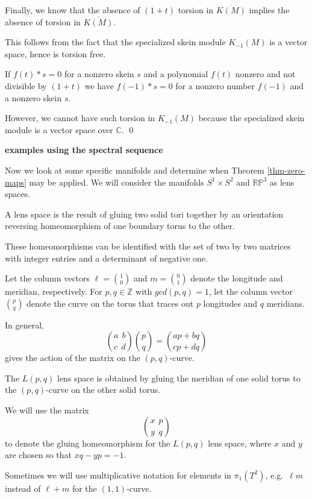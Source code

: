 \documentclass{slides}
\newcommand{\bbc}{\mathbb{C}}
\theoremstyle{definition}
\begin{document}
\begin{slide}
Finally, we know that the absence of $(1+t)$ torsion in
$\overline{K(M)}$ implies the absence of torsion in $\overline{K(M)}$.

This
follows from the fact that the specialized skein module
$K_{-1}(M)$ is a vector space, hence is torsion free.

If $f(t)*s = 0$ for a nonzero skein $s$ and a 
polynomial $f(t)$ nonzero and not divisible by $(1+t)$ we
have $f(-1)*s = 0$ for a nonzero number $f(-1)$ and a
nonzero skein $s$.

However, we cannot have such torsion
in $K_{-1}(M)$ because the specialized skein module is
a vector space over $\bbc$.
\qed
\end{slide}

\begin{slide}
\textbf{examples using the spectral sequence}

Now we look at some specific manifolds and
determine when Theorem \ref{thm-zero-maps} may be applied.
We will consider the manifolds $S^1 \times S^2$ and
$\mathbb{RP}^3$ as lens spaces.

A lens space is the result of
gluing two solid tori together by an
orientation reversing homeomorphism of one boundary torus to
the other.

These homeomorphisms can be identified with the set of
two by two matrices with integer entries and a determinant
of negative one.

Let the column vectors
$\ell = \binom{1}{0}$ and $m = \binom{0}{1}$
denote the longitude and meridian, respectively.
For $p, q \in \mathbb{Z}$
with $gcd(p,q)=1$, let the column vector
$\binom{p}{q}$
denote the
curve on the torus that traces out $p$
longitudes and $q$ meridians.
\end{slide}

\begin{slide}
In general,
$$
\binom{a~~b}{c~~d}
\binom{p}{q}
=
\binom{ap+bq}{cp+dq}
$$
gives the action of the matrix on the $(p,q)$-curve.

The $L(p,q)$ lens space is obtained by gluing the meridian of
one solid torus to the $(p,q)$-curve on the
other solid torus.

We will use the matrix
$$\binom{x~~p}{y~~q}$$
to denote the gluing homeomorphism for the $L(p,q)$ lens space,
where $x$ and $y$ are
chosen so that $xq - yp = -1$.

Sometimes we will use multiplicative
notation for elements in $\pi_1(T^2)$, e.g.\ $\ell m$ instead
of $\ell + m$ for the $(1,1)$-curve.
\end{slide}
\end{document}
